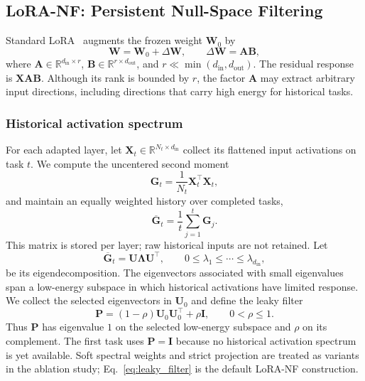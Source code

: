 \subsection{LoRA-NF: Persistent Null-Space Filtering}
\label{sec:lora_nf}

Standard LoRA~\cite{hu2022lora} augments the frozen weight $\mathbf{W}_0$ by
\begin{equation}
    \mathbf{W}=\mathbf{W}_0+\Delta\mathbf{W},
    \qquad
    \Delta\mathbf{W}=\mathbf{A}\mathbf{B},
    \label{eq:lora}
\end{equation}
where $\mathbf{A}\in\mathbb{R}^{d_{\mathrm{in}}\times r}$, $\mathbf{B}\in\mathbb{R}^{r\times d_{\mathrm{out}}}$, and $r\ll\min(d_{\mathrm{in}},d_{\mathrm{out}})$. The residual response is $\mathbf{X}\mathbf{A}\mathbf{B}$. Although its rank is bounded by $r$, the factor $\mathbf{A}$ may extract arbitrary input directions, including directions that carry high energy for historical tasks.

\subsubsection{Historical activation spectrum}

For each adapted layer, let $\mathbf{X}_t\in\mathbb{R}^{N_t\times d_{\mathrm{in}}}$ collect its flattened input activations on task $t$. We compute the uncentered second moment
\begin{equation}
    \mathbf{G}_t=\frac{1}{N_t}\mathbf{X}_t^\top\mathbf{X}_t,
    \label{eq:task_gram}
\end{equation}
and maintain an equally weighted history over completed tasks,
\begin{equation}
    \overline{\mathbf{G}}_t=\frac{1}{t}\sum_{j=1}^{t}\mathbf{G}_j.
    \label{eq:history_gram}
\end{equation}
This matrix is stored per layer; raw historical inputs are not retained. Let
\begin{equation}
    \overline{\mathbf{G}}_t
    =\mathbf{U}\boldsymbol{\Lambda}\mathbf{U}^\top,
    \qquad
    0\leq\lambda_1\leq\cdots\leq\lambda_{d_{\mathrm{in}}},
    \label{eq:history_eig}
\end{equation}
be its eigendecomposition. The eigenvectors associated with small eigenvalues span a low-energy subspace in which historical activations have limited response. We collect the selected eigenvectors in $\mathbf{U}_0$ and define the leaky filter
\begin{equation}
    \mathbf{P}
    =(1-\rho)\mathbf{U}_0\mathbf{U}_0^\top+\rho\mathbf{I},
    \qquad 0<\rho\leq 1.
    \label{eq:leaky_filter}
\end{equation}
Thus $\mathbf{P}$ has eigenvalue $1$ on the selected low-energy subspace and $\rho$ on its complement. The first task uses $\mathbf{P}=\mathbf{I}$ because no historical activation spectrum is yet available. Soft spectral weights and strict projection are treated as variants in the ablation study; Eq.~\eqref{eq:leaky_filter} is the default LoRA-NF construction.

